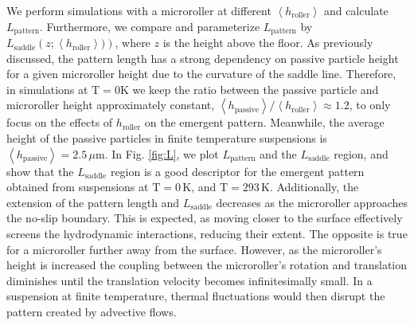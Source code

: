 \documentclass[12pt]{article}
\begin{document}
We perform simulations with a microroller at different $\left < h_\mathrm{roller} \right >$ and calculate $L_\mathrm{pattern}$. Furthermore, we compare and parameterize $L_\mathrm{pattern}$ by $L_\mathrm{saddle} \left( z ;\left <  h_\mathrm{roller} \right>)\right)$, where $z$ is the height above the floor. 
As previously discussed, the pattern length has a strong dependency on passive particle height for a given microroller height due to the curvature of the saddle line. Therefore, in simulations at $\mathrm{T} = 0 \mathrm{K}$ we keep the ratio between the passive particle and microroller height approximately constant, $ \left < h_\mathrm{passive} \right > / \left <  h_\mathrm{roller} \right> \approx 1.2 $, to only focus on the effects of $h_\mathrm{roller}$ on the emergent pattern. Meanwhile, the average height of the passive particles in finite temperature suspensions is $ \left < h_\mathrm{passive} \right >  = 2.5 \, \mu \mathrm{m}$. 
In Fig. \ref{fig:L}, we plot $L_\mathrm{pattern}$ and the $L_\mathrm{saddle}$ region, and show that the $L_\mathrm{saddle}$ region is a good descriptor for the emergent pattern obtained from suspensions at $\mathrm{T} = 0 \, \mathrm{K}$, and $\mathrm{T} = 293 \, \mathrm{K}$. Additionally, the extension of the pattern length and $L_\mathrm{saddle}$ decreases as the microroller approaches the no-slip boundary. This is expected, as moving closer to the surface effectively screens the hydrodynamic interactions, reducing their extent. The opposite is true for a microroller further away from the surface. However, as the microroller's height is increased the coupling between the microroller's rotation and translation diminishes until the translation velocity becomes infinitesimally small. In a suspension at finite temperature, thermal fluctuations would then disrupt the pattern created by advective flows. 
\end{document}
